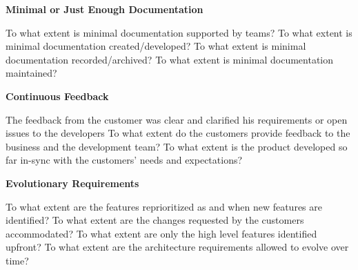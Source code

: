 \textbf{Minimal or Just Enough Documentation}
\begin{itemize}
	\ops To what extent is minimal documentation supported by teams? 
	\ops To what extent is minimal documentation created/developed? 
	\ops To what extent is minimal documentation recorded/archived? 
	\ops To what extent is minimal documentation maintained? 
\end{itemize}

\textbf{Continuous Feedback}
\begin{itemize}
	\pam The feedback from the customer was clear and clarified his requirements or open issues to the developers %
	\ops To what extent do the customers provide feedback to the business and the development team? 
	\ops To what extent is the product developed so far in-sync with the customers' needs and expectations?
\end{itemize}

\textbf{Evolutionary Requirements}
\begin{itemize}
	\ops To what extent are the features reprioritized as and when new features are identified?
	\ops To what extent are the changes requested by the customers accommodated? 
	\ops To what extent are only the high level features identified upfront?
	\ops To what extent are the architecture requirements allowed to evolve over time?
\end{itemize}

%
